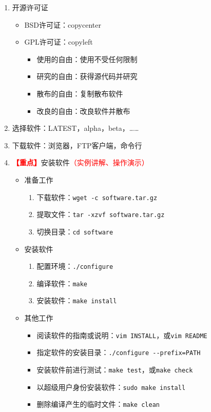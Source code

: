\documentclass{TIJMUjiaoanLL}
\begin{document}
\begin{enumerate}
\begin{enumerate}
      \item 开源许可证
	\begin{itemize}
	  \item BSD许可证：copycenter
	  \item GPL许可证：copyleft
	    \begin{itemize}
              \item 使用的自由：使用不受任何限制
	      \item 研究的自由：获得源代码并研究
	      \item 散布的自由：复制散布软件
	      \item 改良的自由：改良软件并散布
	    \end{itemize}
	\end{itemize}
      \item 选择软件：LATEST，alpha，beta，……
      \item 下载软件：浏览器，FTP客户端，命令行
      \item \textcolor{red}{\textbf{【重点】}}安装软件\textcolor{red}{（实例讲解、操作演示）}
	\begin{itemize}
	  \item 准备工作
	    \begin{enumerate}
              \item 下载软件：\verb|wget -c software.tar.gz|
	      \item 提取文件：\verb|tar -xzvf software.tar.gz|
	      \item 切换目录：\verb|cd software|
	    \end{enumerate}
	  \item 安装软件
	    \begin{enumerate}
              \item 配置环境：\verb|./configure|
	      \item 编译软件：\verb|make|
	      \item 安装软件：\verb|make install|
	    \end{enumerate}
	  \item 其他工作
	    \begin{itemize}
	      \item 阅读软件的指南或说明：\verb|vim INSTALL|，或\verb|vim README|
	      \item 指定软件的安装目录：\verb|./configure --prefix=PATH|
	      \item 安装软件前进行测试：\verb|make test|，或\verb|make check|
	      \item 以超级用户身份安装软件：\verb|sudo make install|
	      \item 删除编译产生的临时文件：\verb|make clean|
	    \end{itemize}
	\end{itemize}
    \end{enumerate}


\end{enumerate}
\end{document}

